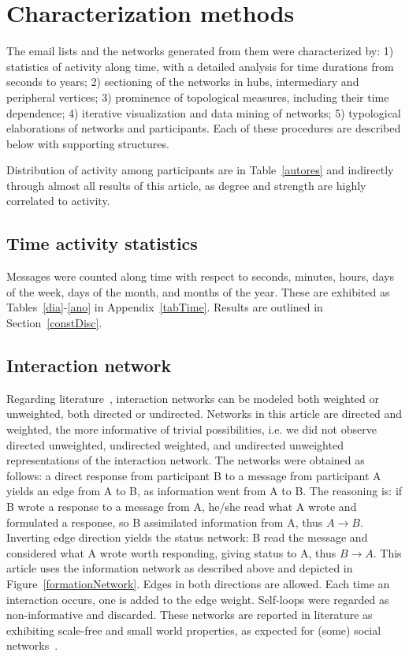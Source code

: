 \documentclass[%
 aip,
 jmp,%
 amsmath,amssymb,
 reprint,%
]{revtex4-1}
\begin{document}
\section{Characterization methods}
The email lists and the networks generated from them were characterized by: 1) statistics of activity along time, with a detailed analysis for time durations from seconds to years; 2)  sectioning of the networks in hubs, intermediary and peripheral vertices; 3) prominence of topological measures, including their time dependence; 4) iterative visualization and data mining of networks; 5) typological elaborations of networks and participants.  Each of these procedures are described below with supporting structures.

Distribution of activity among participants are in Table~\ref{autores} and indirectly through almost all results of this article, as degree and strength are highly correlated to activity.

  \subsection{Time activity statistics}                          
Messages were counted along time with respect to seconds, minutes, hours, days of the week, days of the month, and months of the year. These are exhibited as Tables~\ref{dia}-\ref{ano} in Appendix~\ref{tabTime}. Results are outlined in Section~\ref{constDisc}.

    \subsection{Interaction network}\label{intNet}                     
Regarding literature~\cite{bird,newmanCommunityDirected,newmanCommunity2013}, interaction networks can be modeled both weighted or unweighted, both directed or undirected. Networks in this article are directed and weighted, the more informative of trivial possibilities, i.e. we did not observe directed unweighted, undirected weighted, and undirected unweighted representations of the interaction network. The networks were obtained as follows: a direct response from participant B to a message from participant A yields an edge from A to B, as information went from A to B. The reasoning is: if B wrote a response to a message from A, he/she read what A wrote and formulated a response, so B assimilated information from A, thus $A \rightarrow B$. Inverting edge direction yields the status network: B read the message and considered what A wrote worth responding, giving status to A, thus $B\rightarrow A$. This article uses the information network as described above and depicted in Figure~\ref{formationNetwork}. Edges in both directions are allowed. Each time an interaction occurs, one is added to the edge weight. Self-loops were regarded as non-informative and discarded. These networks are reported in literature as exhibiting scale-free and small world properties, as expected for  (some) social networks~\cite{bird,newmanBook}.
\end{document}
